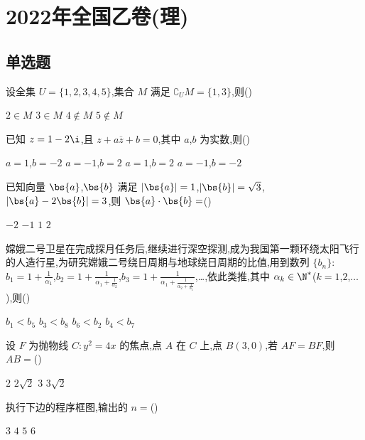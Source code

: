 \chapter{2022年全国乙卷(理)}

\section{单选题}

\begin{problem}
设全集 \(U=\{1,2,3,4,5\}\),集合 \(M\) 满足 \(\complement_U M=\{1,3\}\),则(\quad)

\choices
    {\(2\in M\)}
    {\(3\in M\)}
    {\(4\notin M\)}
    {\(5\notin M\)}
\end{problem}

\begin{problem}
已知 \(z=1-2\i\),且 \(z+a\overline z+b=0\),其中 \(a\),\(b\) 为实数,则(\quad)

\choices
    {\(a=1\),\(b=-2\)}
    {\(a=-1\),\(b=2\)}
    {\(a=1\),\(b=2\)}
    {\(a=-1\),\(b=-2\)}
\end{problem}

\begin{problem}
已知向量 \(\bs{a}\),\(\bs{b}\) 满足 \(|\bs{a}|=1\),\(|\bs{b}|=\sqrt{3}\),\(|\bs{a}-2\bs{b}|=3\),则 \(\bs{a}\cdot\bs{b}=\)(\quad)

\choices
    {\(-2\)}
    {\(-1\)}
    {\(1\)}
    {\(2\)}
\end{problem}

\begin{problem}
嫦娥二号卫星在完成探月任务后,继续进行深空探测,成为我国第一颗环绕太阳飞行的人造行星,为研究嫦娥二号绕日周期与地球绕日周期的比值,用到数列 \(\{b_n\}\):\(b_1=1+\frac{1}{\alpha_1}\),\(b_2=1+\frac{1}{\alpha_1+\frac{1}{\alpha_2}}\),\(b_3=1+\frac{1}{\alpha_1+\frac{1}{\alpha_2+\frac{1}{\alpha_3}}}\),…,依此类推,其中 \(\alpha_k\in\N^*\)(\(k=1\),\(2\),\(\dots\)),则(\quad)

\choices
    {\(b_1<b_5\)}
    {\(b_3<b_8\)}
    {\(b_6<b_2\)}
    {\(b_4<b_7\)}
\end{problem}

\begin{problem}
设 \(F\) 为抛物线 \(C:y^2=4x\) 的焦点,点 \(A\) 在 \(C\) 上,点 \(B(3,0)\),若 \(AF=BF\),则 \(AB=\)(\quad)

\choices
    {\(2\)}
    {\(2\sqrt{2}\)}
    {\(3\)}
    {\(3\sqrt{2}\)}
\end{problem}

\begin{problem}
执行下边的程序框图,输出的 \(n=\)(\quad)


\choices
    {\(3\)}
    {\(4\)}
    {\(5\)}
    {\(6\)}
\end{problem}

